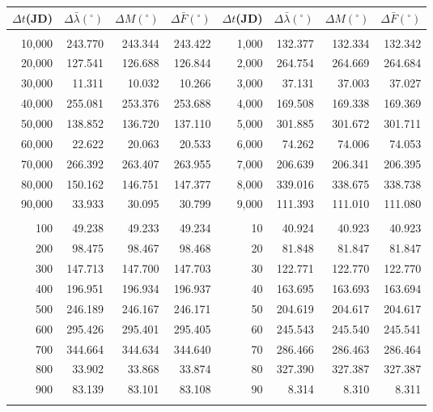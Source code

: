\clearpage
\newpage
\begin{table}
\centering
\begin{tabular}{rrrr|rrrr}
$\Delta t$(JD)& $\Delta\bar{\lambda}(^\circ)$ &  $\Delta M(^\circ)$ & $\Delta \bar{F}(^\circ)$& $\Delta t$(JD) & $\Delta\bar{\lambda}(^\circ)$ & $\Delta M(^\circ)$ 
&$\Delta \bar{F}(^\circ)$\\ \hline
&&&&&&&\\[-1.75ex]
10,000 & 243.770 & 243.344 & 243.422 & 1,000 & 132.377 & 132.334 & 132.342\\
20,000 & 127.541 & 126.688 & 126.844 & 2,000 & 264.754 & 264.669 & 264.684\\
30,000 &  11.311 &  10.032 &  10.266 & 3,000 &  37.131 &  37.003 &  37.027\\
40,000 & 255.081 & 253.376 & 253.688 & 4,000 & 169.508 & 169.338 & 169.369\\
50,000 & 138.852 & 136.720 & 137.110 & 5,000 & 301.885 & 301.672 & 301.711\\
60,000 &  22.622 &  20.063 &  20.533 & 6,000 &  74.262 &  74.006 &  74.053\\
70,000 & 266.392 & 263.407 & 263.955 & 7,000 & 206.639 & 206.341 & 206.395\\
80,000 & 150.162 & 146.751 & 147.377 & 8,000 & 339.016 & 338.675 & 338.738\\
90,000 &  33.933 &  30.095 &  30.799 & 9,000 & 111.393 & 111.010 & 111.080\\
&&&&&&&\\
100 &  49.238 &  49.233 &  49.234 & 10 &  40.924 &  40.923 &  40.923\\
200 &  98.475 &  98.467 &  98.468 & 20 &  81.848 &  81.847 &  81.847\\
300 & 147.713 & 147.700 & 147.703 & 30 & 122.771 & 122.770 & 122.770\\
400 & 196.951 & 196.934 & 196.937 & 40 & 163.695 & 163.693 & 163.694\\
500 & 246.189 & 246.167 & 246.171 & 50 & 204.619 & 204.617 & 204.617\\
600 & 295.426 & 295.401 & 295.405 & 60 & 245.543 & 245.540 & 245.541\\
700 & 344.664 & 344.634 & 344.640 & 70 & 286.466 & 286.463 & 286.464\\
800 &  33.902 &  33.868 &  33.874 & 80 & 327.390 & 327.387 & 327.387\\
900 &  83.139 &  83.101 &  83.108 & 90 &   8.314 &   8.310 &   8.311\\
&&&&&&&\\

\end{tabular}
\end{table}
